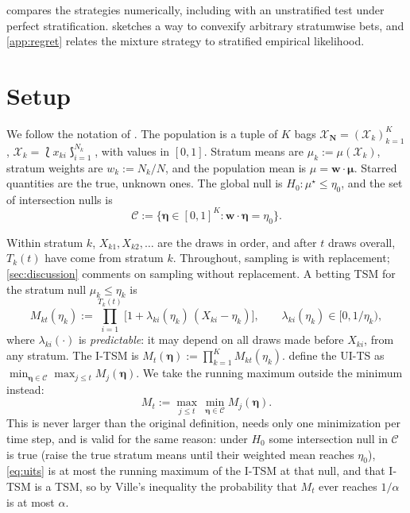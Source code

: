\documentclass[11pt]{article}
\newcommand{\bs}{\boldsymbol}
\newcommand{\calC}{\mathcal{C}}
\newcommand{\calX}{\mathcal{X}}
\theoremstyle{plain}
\theoremstyle{definition}
\theoremstyle{remark}
\begin{document}
 compares the strategies numerically, including with an unstratified test under perfect
stratification.   sketches a way to convexify arbitrary stratumwise bets, and \cref{app:regret}
relates the mixture strategy to stratified empirical likelihood.

\section{Setup}\label{sec:setup}

We follow the notation of \citet{spertus2024sequential}.  The population is a tuple of $K$ bags
$\calX_{\bs N} = (\calX_k)_{k=1}^K$, $\calX_k = \Lbag x_{ki}\Rbag_{i=1}^{N_k}$, with values in $[0,1]$.
Stratum means are $\mu_k := \mu(\calX_k)$, stratum weights are $w_k := N_k/N$, and the population mean is
$\mu = \bs w \cdot \bs\mu$.  Starred quantities are the true, unknown ones.  The global null is
$H_0 : \mu^\star \le \eta_0$, and the set of intersection nulls is
\begin{equation}\label{eq:C}
\calC := \{\bs\eta \in [0,1]^K : \bs w\cdot \bs\eta = \eta_0\}.
\end{equation}

Within stratum $k$, $X_{k1}, X_{k2},\ldots$ are the draws in order, and after $t$ draws overall, $T_k(t)$ have come
from stratum $k$.  Throughout, sampling is with replacement; \cref{sec:discussion} comments on sampling without
replacement.  A betting TSM for the stratum null $\mu_k\le\eta_k$ is
\begin{equation}\label{eq:betting-tsm}
M_{kt}(\eta_k) := \prod_{i=1}^{T_k(t)} \bigl[1 + \lambda_{ki}(\eta_k)\,(X_{ki}-\eta_k)\bigr],
\qquad \lambda_{ki}(\eta_k) \in [0, 1/\eta_k),
\end{equation}
where $\lambda_{ki}(\cdot)$ is \emph{predictable}: it may depend on all draws made before $X_{ki}$, from any stratum.
The I-TSM is $M_t(\bs\eta) := \prod_{k=1}^K M_{kt}(\eta_k)$.  \citet[Section 4]{spertus2024sequential} define the
UI-TS as $\min_{\bs\eta\in\calC}\max_{j\le t}M_j(\bs\eta)$.  We take the running maximum outside the minimum instead:
\begin{equation}\label{eq:uits}
M_t := \max_{j\le t}\,\min_{\bs\eta\in\calC} M_j(\bs\eta).
\end{equation}
This is never larger than the original definition, needs only one minimization per time step, and is valid for the
same reason: under $H_0$ some intersection null in $\calC$ is true (raise the true stratum means until their weighted
mean reaches $\eta_0$), \eqref{eq:uits} is at most the running maximum of the I-TSM at that null, and that I-TSM is a
TSM, so by Ville's inequality \citep{ville1939etude} the probability that $M_t$ ever reaches $1/\alpha$ is at most
$\alpha$.
\end{document}
